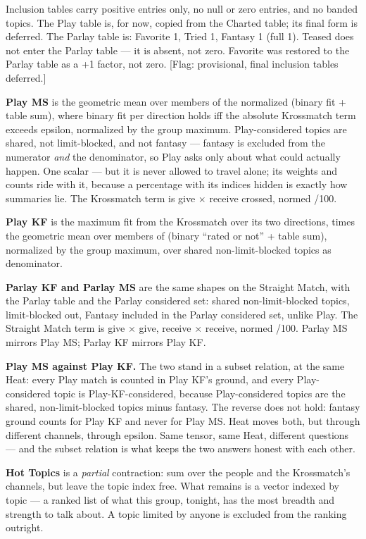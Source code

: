 Inclusion tables carry positive entries only, no null or zero entries,
and no banded topics. The Play table is, for now, copied from the
Charted table; its final form is deferred. The Parlay table is: Favorite
1, Tried 1, Fantasy 1 (full 1). Teased does not enter the Parlay table
--- it is absent, not zero. Favorite was restored to the Parlay table as
a +1 factor, not zero. {[}Flag: provisional, final inclusion tables
deferred.{]}

\textbf{Play MS} is the geometric mean over members of the normalized
(binary fit + table sum), where binary fit per direction holds iff the
absolute Krossmatch term exceeds epsilon, normalized by the group
maximum. Play-considered topics are shared, not limit-blocked, and not
fantasy --- fantasy is excluded from the numerator \emph{and} the
denominator, so Play asks only about what could actually happen. One
scalar --- but it is never allowed to travel alone; its weights and
counts ride with it, because a percentage with its indices hidden is
exactly how summaries lie. The Krossmatch term is give $\times$ receive
crossed, normed /100.

\textbf{Play KF} is the maximum fit from the Krossmatch over its two
directions, times the geometric mean over members of (binary ``rated or
not'' + table sum), normalized by the group maximum, over shared
non-limit-blocked topics as denominator.

\textbf{Parlay KF and Parlay MS} are the same shapes on the Straight
Match, with the Parlay table and the Parlay considered set: shared
non-limit-blocked topics, limit-blocked out, Fantasy included in the
Parlay considered set, unlike Play. The Straight Match term is give $\times$
give, receive $\times$ receive, normed /100. Parlay MS mirrors Play MS; Parlay
KF mirrors Play KF.

\textbf{Play MS against Play KF.} The two stand in a subset relation, at
the same Heat: every Play match is counted in Play KF's ground, and
every Play-considered topic is Play-KF-considered, because
Play-considered topics are the shared, non-limit-blocked topics minus
fantasy. The reverse does not hold: fantasy ground counts for Play KF
and never for Play MS. Heat moves both, but through different channels,
through epsilon. Same tensor, same Heat, different questions --- and the
subset relation is what keeps the two answers honest with each other.

\textbf{Hot Topics} is a \emph{partial} contraction: sum over the people
and the Krossmatch's channels, but leave the topic index free. What
remains is a vector indexed by topic --- a ranked list of what this
group, tonight, has the most breadth and strength to talk about. A topic
limited by anyone is excluded from the ranking outright.

